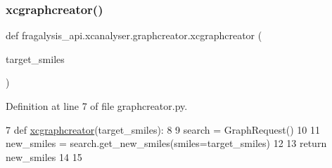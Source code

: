 \subsubsection{\texorpdfstring{xcgraphcreator()}{xcgraphcreator()}}
{\footnotesize\ttfamily def fragalysis\+\_\+api.\+xcanalyser.\+graphcreator.\+xcgraphcreator (\begin{DoxyParamCaption}\item[{}]{target\+\_\+smiles }\end{DoxyParamCaption})}



Definition at line 7 of file graphcreator.\+py.


\begin{DoxyCode}
7 \textcolor{keyword}{def }\hyperlink{namespacefragalysis__api_1_1xcanalyser_1_1graphcreator_a028827844f85500b1fab4ff79cc7718c}{xcgraphcreator}(target\_smiles):
8 
9     search = GraphRequest()
10 
11     new\_smiles = search.get\_new\_smiles(smiles=target\_smiles)
12     
13     \textcolor{keywordflow}{return} new\_smiles
14 
15 
\end{DoxyCode}
